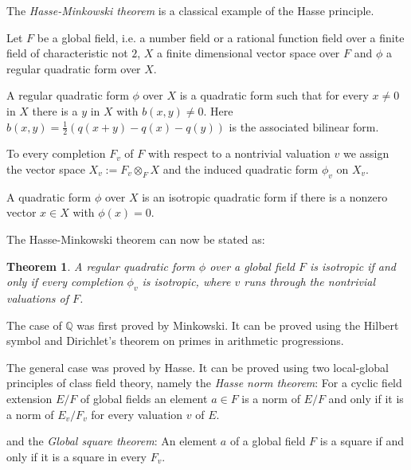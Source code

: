 \documentclass[12pt]{article}
\newtheorem{thmplain}{Theorem}
\begin{document}
The \emph{Hasse-Minkowski theorem} is a classical example of the Hasse principle.

Let $F$ be a global field, i.e. a number field or a rational function field over a finite field of characteristic not $2$, $X$ a finite dimensional vector space over $F$ and $\phi$ a regular quadratic form over $X$.

A regular quadratic form $\phi$ over $X$ is a quadratic form such that for every $x\neq 0$ in $X$ there is a $y$ in $X$ with $b(x,y)\neq0$. Here $b(x,y)=\frac{1}{2} (q(x+y)-q(x)-q(y))$ is the associated bilinear form.

To every completion $F_v$ of $F$ with respect to a nontrivial valuation $v$ we assign the vector space $X_v := F_v \otimes_F X$ and the induced quadratic form $\phi_v$ on $X_v$.

A quadratic form $\phi$ over $X$ is an isotropic quadratic form if there is a nonzero vector $x\in X$ with $\phi(x)=0$.

The Hasse-Minkowski theorem can now be stated as:

\begin{thmplain}
A regular quadratic form $\phi$ over a global field $F$ is isotropic if and only if every completion $\phi_v$ is isotropic, where $v$ runs through the nontrivial valuations of $F$.
\end{thmplain}

The case of $\mathbb{Q}$ was first proved by Minkowski. It can be proved using the Hilbert symbol and Dirichlet's theorem on primes in arithmetic progressions.

The general case was proved by Hasse. It can be proved using two local-global principles of class field theory, namely the \emph{Hasse norm theorem}:
For a cyclic field extension $E/F$ of global fields an element $a\in F$ is a norm of $E/F$ and only if it is a norm of $E_v/F_v$ for every valuation $v$ of $E$.

and the \emph{Global square theorem}:
An element $a$ of a global field $F$ is a square if and only if it is a square in every $F_v$.
\end{document}
